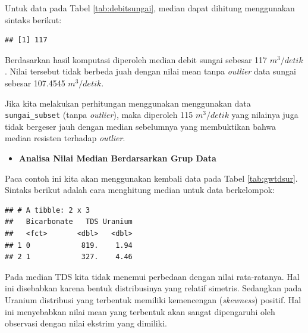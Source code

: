 \documentclass[]{book}
\newenvironment{Shaded}{\begin{snugshade}}{\end{snugshade}}
\newcommand{\KeywordTok}[1]{\textcolor[rgb]{0.13,0.29,0.53}{\textbf{#1}}}
\newcommand{\DataTypeTok}[1]{\textcolor[rgb]{0.13,0.29,0.53}{#1}}
\newcommand{\StringTok}[1]{\textcolor[rgb]{0.31,0.60,0.02}{#1}}
\newcommand{\OperatorTok}[1]{\textcolor[rgb]{0.81,0.36,0.00}{\textbf{#1}}}
\newcommand{\NormalTok}[1]{#1}
\providecommand{\tightlist}{%
  \setlength{\itemsep}{0pt}\setlength{\parskip}{0pt}}
\begin{document}
Untuk data pada Tabel \ref{tab:debitsungai}, median dapat dihitung
menggunakan sintaks berikut:

\begin{Shaded}
\end{Shaded}

\begin{verbatim}
## [1] 117
\end{verbatim}

Berdasarkan hasil komputasi diperoleh median debit sungai sebesar 117
\(m^3/detik\). Nilai tersebut tidak berbeda juah dengan nilai mean tanpa
\emph{outlier} data sungai sebesar 107.4545 \(m^3/detik\).

Jika kita melakukan perhitungan menggunakan menggunakan data
\texttt{sungai\_subset} (tanpa \emph{outlier}), maka diperoleh 115
\(m^3/detik\) yang nilainya juga tidak bergeser jauh dengan median
sebelumnya yang membuktikan bahwa median resisten terhadap
\emph{outlier}.

\begin{itemize}
\tightlist
\item
  \textbf{Analisa Nilai Median Berdarsarkan Grup Data}
\end{itemize}

Paca contoh ini kita akan menggunakan kembali data pada Tabel
\ref{tab:gwtdsur}. Sintaks berikut adalah cara menghitung median untuk
data berkelompok:

\begin{Shaded}
\end{Shaded}

\begin{verbatim}
## # A tibble: 2 x 3
##   Bicarbonate   TDS Uranium
##   <fct>       <dbl>   <dbl>
## 1 0            819.    1.94
## 2 1            327.    4.46
\end{verbatim}

Pada median TDS kita tidak menemui perbedaan dengan nilai rata-ratanya.
Hal ini disebabkan karena bentuk distribusinya yang relatif simetris.
Sedangkan pada Uranium distribusi yang terbentuk memiliki kemencengan
(\emph{skewness}) positif. Hal ini menyebabkan nilai mean yang terbentuk
akan sangat dipengaruhi oleh observasi dengan nilai ekstrim yang
dimiliki.
\end{document}
